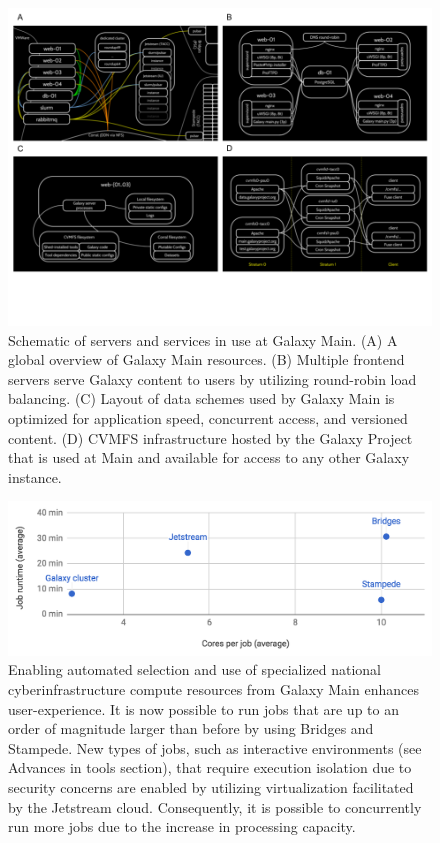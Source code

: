 \begin{figure}[t!]
\centering
\includegraphics[width=\textwidth]{chapters/images/galaxy/setup.png}
\caption{Schematic of servers and services in use at Galaxy Main. (A) A global overview of Galaxy Main resources. (B) Multiple frontend servers serve Galaxy content to users by utilizing round-robin load balancing. (C) Layout of data schemes used by Galaxy Main is optimized for application speed, concurrent access, and versioned content. (D) CVMFS infrastructure hosted by the Galaxy Project that is used at Main and available for access to any other Galaxy instance.}
\label{fig:setup}
\end{figure}

\begin{figure}[t!]
\centering
\includegraphics[width=\textwidth]{chapters/images/galaxy/infra.png}
\caption{Enabling automated selection and use of specialized national cyberinfrastructure compute resources from Galaxy Main enhances user-experience. It is now possible to run jobs that are up to an order of magnitude larger than before by using Bridges and Stampede. New types of jobs, such as interactive environments (see Advances in tools section), that require execution isolation due to security concerns are enabled by utilizing virtualization facilitated by the Jetstream cloud. Consequently, it is possible to concurrently run more jobs due to the increase in processing capacity.}
\label{fig:infra}
\end{figure}

